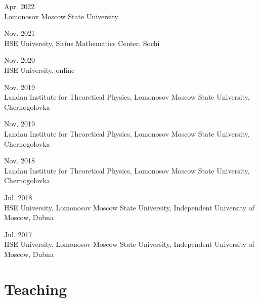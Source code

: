 \documentclass[11pt,letterpaper]{report}
\begin{document}
\begin{tablist}
      \item{Apr. 2022} \\ Lomonosov Moscow State University
      
      \item{Nov. 2021} \\ HSE University, Sirius Mathematics Center, Sochi  
      
       \item{Nov. 2020} \\ HSE University, online
       
       \item{Nov. 2019} \\ Landau Institute for Theoretical Physics, Lomonosov Moscow State University, Chernogolovka
       
       \item{Nov. 2019} \\ Landau Institute for Theoretical Physics, Lomonosov Moscow State University, Chernogolovka
       
        \item{Nov. 2018} \\ Landau Institute for Theoretical Physics, Lomonosov Moscow State University, Chernogolovka
       
       \item{Jul. 2018} \\ HSE University, Lomonosov Moscow State University, Independent University of Moscow, Dubna
       
        \item{Jul. 2017} \\ HSE University, Lomonosov Moscow State University, Independent University of Moscow, Dubna
        
            
    \end{tablist}

    
    
    
    
    \section*{Teaching}
\end{document}

